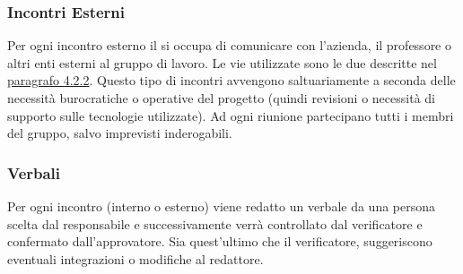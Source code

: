 	\subsubsection{Incontri Esterni}
	Per ogni incontro esterno il \RdP{} si occupa di comunicare con l'azienda, il professore o altri enti esterni al gruppo di lavoro. 
	Le vie utilizzate sono le due descritte nel \hyperref[sec:Comunicazioni Esterne]{paragrafo 4.2.2}.
	Questo tipo di incontri avvengono saltuariamente a seconda delle necessità burocratiche o operative del progetto (quindi revisioni o necessità di supporto sulle tecnologie utilizzate).
	Ad ogni riunione partecipano tutti i membri del gruppo, salvo imprevisti inderogabili.
	\subsubsection{Verbali}
	Per ogni incontro (interno o esterno) viene redatto un verbale da una persona scelta dal responsabile e successivamente verrà controllato dal verificatore e confermato dall’approvatore. Sia quest'ultimo che il verificatore, suggeriscono eventuali integrazioni o modifiche al redattore.
	